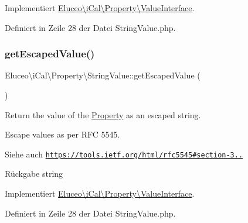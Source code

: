 Implementiert \mbox{\hyperlink{interface_eluceo_1_1i_cal_1_1_property_1_1_value_interface_a408412ae5d11fd3f239c7985aede8c32}{Eluceo\textbackslash{}i\+Cal\textbackslash{}\+Property\textbackslash{}\+Value\+Interface}}.



Definiert in Zeile 28 der Datei String\+Value.\+php.

\mbox{\label{class_eluceo_1_1i_cal_1_1_property_1_1_string_value_a76f74785d3f3bd3533c40090d2340c01}} 
\subsubsection{\texorpdfstring{get\+Escaped\+Value()}{getEscapedValue()}\hspace{0.1cm}{\footnotesize\ttfamily [2/3]}}
{\footnotesize\ttfamily Eluceo\textbackslash{}i\+Cal\textbackslash{}\+Property\textbackslash{}\+String\+Value\+::get\+Escaped\+Value (\begin{DoxyParamCaption}{ }\end{DoxyParamCaption})}

Return the value of the \mbox{\hyperlink{class_eluceo_1_1i_cal_1_1_property}{Property}} as an escaped string.

Escape values as per R\+FC 5545.

\begin{DoxySeeAlso}{Siehe auch}
\href{https://tools.ietf.org/html/rfc5545#section-3.3.11}{\tt https\+://tools.\+ietf.\+org/html/rfc5545\#section-\/3..}
\end{DoxySeeAlso}
\begin{DoxyReturn}{Rückgabe}
string 
\end{DoxyReturn}


Implementiert \mbox{\hyperlink{interface_eluceo_1_1i_cal_1_1_property_1_1_value_interface_a408412ae5d11fd3f239c7985aede8c32}{Eluceo\textbackslash{}i\+Cal\textbackslash{}\+Property\textbackslash{}\+Value\+Interface}}.



Definiert in Zeile 28 der Datei String\+Value.\+php.

\mbox{\label{class_eluceo_1_1i_cal_1_1_property_1_1_string_value_a76f74785d3f3bd3533c40090d2340c01}} 
